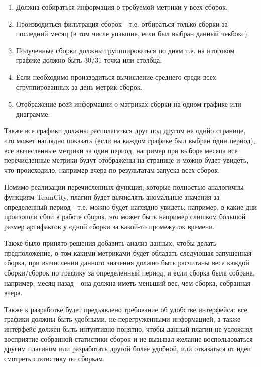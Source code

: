 \begin{enumerate}
	\item Должна собираться информация о требуемой метрики у всех сборок.
	
	\item Производиться фильтрация сборок - т.е. отбираться только сборки за последний месяц (в том числе упавшие, если был выбран данный чекбокс).
	
	\item Полученные сборки должны групппироваться по дням т.е. на итоговом графике должно быть 30/31 точка или столбца.
	
	\item Если необходимо производиться вычисление среднего среди всех сгруппированных за день метрик сборок.
	
	\item Отображение всей информации о матриках сборки на одном графике или диаграмме.
	
	
\end{enumerate}

Также все графики должны располагаться друг под другом на однйо странице, что может наглядно показать (если на каждом графике был выбран один период), все вычесленные метрики за один период, например при выборе месяца все перечисленные метрики будут отображены на странице и можно будет увидеть, что происходило, например вчера по результатам запуска всех сборок.

Помимо реализации перечисленных функция, которые полностью аналогичны функциям TeamCity, плагин будет вычислять аномальные значения за определенный период - т.е. можно будет наглядно увидеть, например, в какие дни произошли сбои в работе сборок, это может быть например слишком большой размер артифактов у одной сборки за какой-то промежуток времени.

Также было принято решения добавить анализ данных, чтобы делать предположение, о том какими метриками будет обладать следующая запущенная сборка, при вычислении данного значения должно быть расчитаны веса каждой сборки/сборок по графику за определенный период, и если сборка была собрана, например, месяц назад - она должна иметь меньший вес, чем сборка, собранная вчера.

Также к разработке будет предъявлено требование об удобстве интерфейса: все графики должны быть удобными, не перегруженными информацией, а также интерфейс должен быть интуитивно понятно, чтобы данный плагин не усложнял восприятие собранной статистики сборок и не вызывал желание воспользоваться другим плагином или разработать другой более удобной, или отказаться от идеи смотреть статистику по сборкам.

